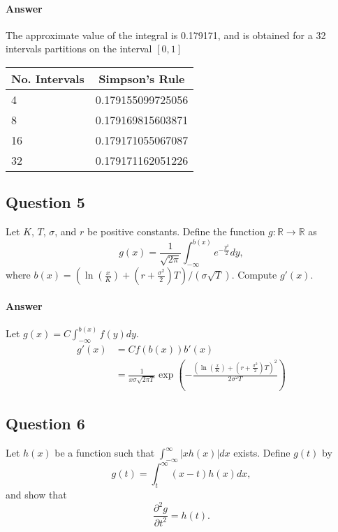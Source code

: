 \paragraph{Answer}
The approximate value of the integral is 0.179171, and is obtained for a 32
    intervals partitions on the interval $ [0, 1] $
\begin{table}
    \center
    \begin{tabular}[c]{l|l}
        \hline
        \multicolumn{1}{c|}{No. Intervals} &
        \multicolumn{1}{c}{Simpson's Rule} \\
        \hline
        4  & 0.179155099725056 \\
        8  & 0.179169815603871 \\
        16 & 0.179171055067087 \\
        32 & 0.179171162051226 \\
        \hline
    \end{tabular}
\end{table}

\subsection{Question 5}
Let $ K $, $ T $, $ \sigma $, and $ r $ be positive constants.
Define the function $ g : \mathbb{R} \rightarrow \mathbb{R} $ as
\begin{equation*}
    g(x) = \frac{1}{\sqrt{2 \pi}} \int_{-\infty}^{b(x)}
        e^{-\frac{y^2}{2}} dy,
\end{equation*}
where $ b(x) = \left( \ln \left( \frac{x}{K} \right) + \left( r +
    \frac{\sigma^2}{2} \right) T \right) / \left( \sigma \sqrt{T} \right) $.
Compute $ g'(x) $.

\paragraph{Answer}
Let $ g(x) = C \int_{-\infty}^{b(x)} f(y) dy $.
\begin{align*}
    g'(x)
        &= C f(b(x)) b'(x) \\
        &= \frac{1}{x \sigma \sqrt{2 \pi T}} \exp \left( -\frac{\left(
            \ln \left( \frac{x}{K} \right) + \left( r + \frac{\sigma^2}{2}
            \right) T \right)^2}{2 \sigma^2 T} \right)
\end{align*}

\subsection{Question 6}
Let $ h(x) $ be a function such that $ \int_{-\infty}^{\infty} |xh(x)| dx $
    exists.
Define $ g(t) $ by
\begin{equation*}
    g(t) = \int_{t}^{\infty} (x - t) h(x) dx,
\end{equation*}
and show that
\begin{equation*}
    \frac{\partial^2 g}{\partial t^2} = h(t).
\end{equation*}

